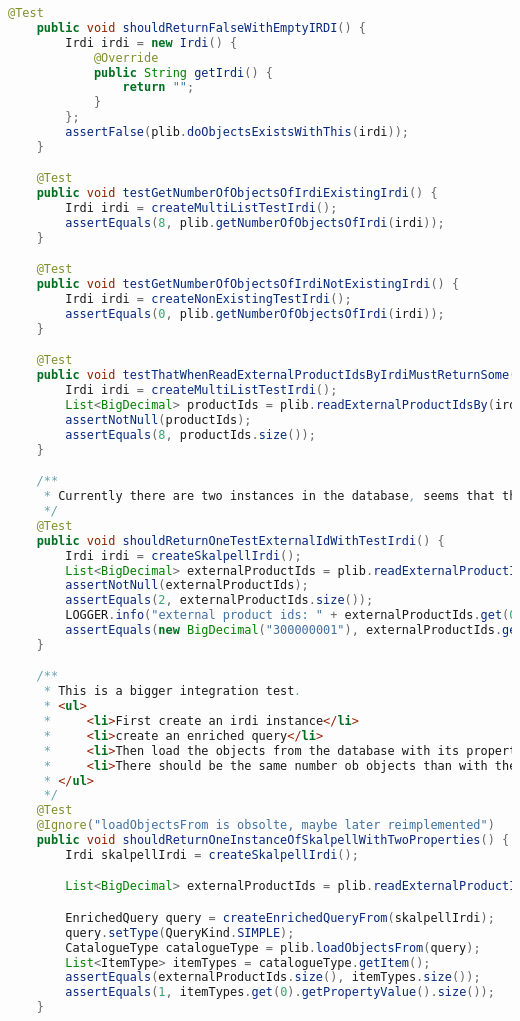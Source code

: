 \begin{lstlisting}[caption=Beispiel eines Integrationstests, language=Java, label=lst:integrationstest_beispiel]
    @Test
    public void shouldReturnFalseWithEmptyIRDI() {
        Irdi irdi = new Irdi() {
            @Override
            public String getIrdi() {
                return "";
            }
        };
        assertFalse(plib.doObjectsExistsWithThis(irdi));
    }

    @Test
    public void testGetNumberOfObjectsOfIrdiExistingIrdi() {
        Irdi irdi = createMultiListTestIrdi();
        assertEquals(8, plib.getNumberOfObjectsOfIrdi(irdi));
    }

    @Test
    public void testGetNumberOfObjectsOfIrdiNotExistingIrdi() {
        Irdi irdi = createNonExistingTestIrdi();
        assertEquals(0, plib.getNumberOfObjectsOfIrdi(irdi));
    }

    @Test
    public void testThatWhenReadExternalProductIdsByIrdiMustReturnSome() throws Exception {
        Irdi irdi = createMultiListTestIrdi();
        List<BigDecimal> productIds = plib.readExternalProductIdsBy(irdi);
        assertNotNull(productIds);
        assertEquals(8, productIds.size());
    }

    /**
     * Currently there are two instances in the database, seems that these are duplicates but not sure.
     */
    @Test
    public void shouldReturnOneTestExternalIdWithTestIrdi() {
        Irdi irdi = createSkalpellIrdi();
        List<BigDecimal> externalProductIds = plib.readExternalProductIdsBy(irdi);
        assertNotNull(externalProductIds);
        assertEquals(2, externalProductIds.size());
        LOGGER.info("external product ids: " + externalProductIds.get(0));
        assertEquals(new BigDecimal("300000001"), externalProductIds.get(0));
    }

    /**
     * This is a bigger integration test.
     * <ul>
     *     <li>First create an irdi instance</li>
     *     <li>create an enriched query</li>
     *     <li>Then load the objects from the database with its properties</li>
     *     <li>There should be the same number ob objects than with the previous check</li>
     * </ul>
     */
    @Test
    @Ignore("loadObjectsFrom is obsolte, maybe later reimplemented")
    public void shouldReturnOneInstanceOfSkalpellWithTwoProperties() {
        Irdi skalpellIrdi = createSkalpellIrdi();

        List<BigDecimal> externalProductIds = plib.readExternalProductIdsBy(skalpellIrdi);

        EnrichedQuery query = createEnrichedQueryFrom(skalpellIrdi);
        query.setType(QueryKind.SIMPLE);
        CatalogueType catalogueType = plib.loadObjectsFrom(query);
        List<ItemType> itemTypes = catalogueType.getItem();
        assertEquals(externalProductIds.size(), itemTypes.size());
        assertEquals(1, itemTypes.get(0).getPropertyValue().size());
    }


\end{lstlisting}
